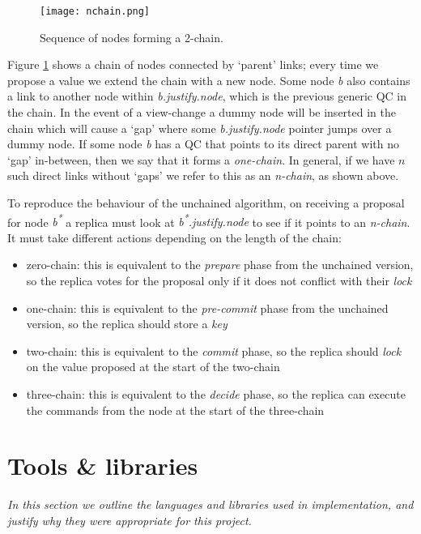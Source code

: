 \begin{figure}[h!]
\centering
\texttt{[image: nchain.png]}
\caption{Sequence of nodes forming a 2-chain.}
\label{nchain}
\end{figure}

Figure \ref{nchain} shows a chain of nodes connected by `parent' links; every time we propose a value we extend the chain with a new node. Some node \textit{b} also contains a link to another node within \textit{b.justify.node}, which is the previous generic QC in the chain. In the event of a view-change a dummy node will be inserted in the chain which will cause a `gap' where some \textit{b.justify.node} pointer jumps over a dummy node. If some node \textit{b} has a QC that points to its direct parent with no `gap' in-between, then we say that it forms a \textit{one-chain}. In general, if we have $n$ such direct links without `gaps' we refer to this as an \textit{n-chain}, as shown above.

To reproduce the behaviour of the unchained algorithm, on receiving a proposal for node \textit{b\textsuperscript{*}} a replica must look at \textit{b\textsuperscript{*}.justify.node} to see if it points to an \textit{n-chain}. It must take different actions depending on the length of the chain:
\begin{itemize}
\item zero-chain: this is equivalent to the \textit{prepare} phase from the unchained version, so the replica votes for the proposal only if it does not conflict with their \textit{lock}
\item one-chain: this is equivalent to the \textit{pre-commit} phase from the unchained version, so the replica should store a \textit{key}
\item two-chain: this is equivalent to the \textit{commit} phase, so the replica should \textit{lock} on the value proposed at the start of the two-chain
\item three-chain: this is equivalent to the \textit{decide} phase, so the replica can execute the commands from the node at the start of the three-chain
\end{itemize}

\section{Tools \& libraries} \label{tools}
\textit{In this section we outline the languages and libraries used in implementation, and justify why they were appropriate for this project.}

